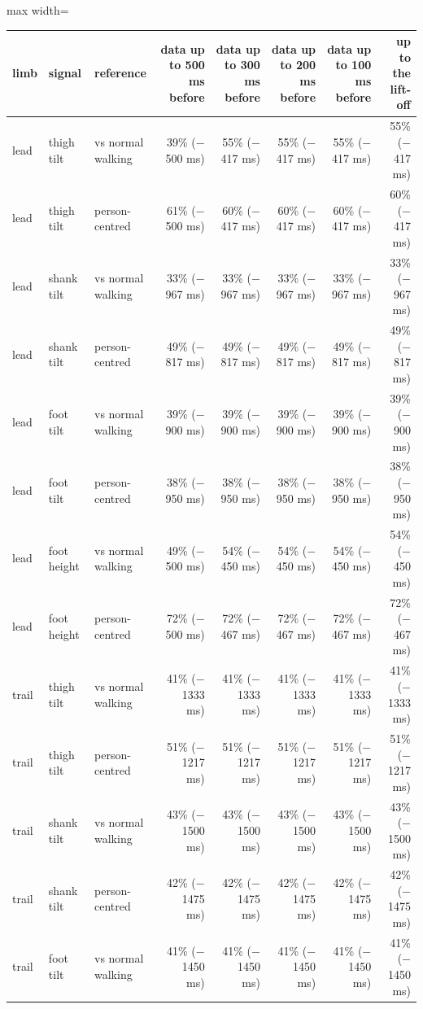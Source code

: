\begin{adjustbox}{max width=\textwidth}
{\scriptsize
\begin{tabular}{lllrrrrr}
\toprule
\textbf{limb} & \textbf{signal} & \textbf{reference} & \textbf{data up to 500 ms before} & \textbf{data up to 300 ms before} & \textbf{data up to 200 ms before} & \textbf{data up to 100 ms before} & \textbf{up to the lift-off} \\
\midrule
lead & thigh tilt & vs normal walking & 39\% ($-$500 ms) & 55\% ($-$417 ms) & 55\% ($-$417 ms) & 55\% ($-$417 ms) & 55\% ($-$417 ms) \\
lead & thigh tilt & person-centred & 61\% ($-$500 ms) & 60\% ($-$417 ms) & 60\% ($-$417 ms) & 60\% ($-$417 ms) & 60\% ($-$417 ms) \\
lead & shank tilt & vs normal walking & 33\% ($-$967 ms) & 33\% ($-$967 ms) & 33\% ($-$967 ms) & 33\% ($-$967 ms) & 33\% ($-$967 ms) \\
lead & shank tilt & person-centred & 49\% ($-$817 ms) & 49\% ($-$817 ms) & 49\% ($-$817 ms) & 49\% ($-$817 ms) & 49\% ($-$817 ms) \\
lead & foot tilt & vs normal walking & 39\% ($-$900 ms) & 39\% ($-$900 ms) & 39\% ($-$900 ms) & 39\% ($-$900 ms) & 39\% ($-$900 ms) \\
lead & foot tilt & person-centred & 38\% ($-$950 ms) & 38\% ($-$950 ms) & 38\% ($-$950 ms) & 38\% ($-$950 ms) & 38\% ($-$950 ms) \\
lead & foot height & vs normal walking & 49\% ($-$500 ms) & 54\% ($-$450 ms) & 54\% ($-$450 ms) & 54\% ($-$450 ms) & 54\% ($-$450 ms) \\
lead & foot height & person-centred & 72\% ($-$500 ms) & 72\% ($-$467 ms) & 72\% ($-$467 ms) & 72\% ($-$467 ms) & 72\% ($-$467 ms) \\
trail & thigh tilt & vs normal walking & 41\% ($-$1333 ms) & 41\% ($-$1333 ms) & 41\% ($-$1333 ms) & 41\% ($-$1333 ms) & 41\% ($-$1333 ms) \\
trail & thigh tilt & person-centred & 51\% ($-$1217 ms) & 51\% ($-$1217 ms) & 51\% ($-$1217 ms) & 51\% ($-$1217 ms) & 51\% ($-$1217 ms) \\
trail & shank tilt & vs normal walking & 43\% ($-$1500 ms) & 43\% ($-$1500 ms) & 43\% ($-$1500 ms) & 43\% ($-$1500 ms) & 43\% ($-$1500 ms) \\
trail & shank tilt & person-centred & 42\% ($-$1475 ms) & 42\% ($-$1475 ms) & 42\% ($-$1475 ms) & 42\% ($-$1475 ms) & 42\% ($-$1475 ms) \\
trail & foot tilt & vs normal walking & 41\% ($-$1450 ms) & 41\% ($-$1450 ms) & 41\% ($-$1450 ms) & 41\% ($-$1450 ms) & 41\% ($-$1450 ms) \\

\end{tabular}}
\end{adjustbox}
